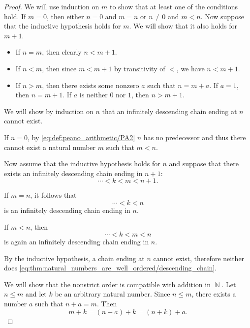 \begin{proof}
  We will use induction on \( m \) to show that at least one of the conditions hold. If \( m = 0 \), then either \( n = 0 \) and \( m = n \) or \( n \neq 0 \) and \( m < n \). Now suppose that the inductive hypothesis holds for \( m \). We will show that it also holds for \( m + 1 \).
  \begin{itemize}
    \item If \( n = m \), then clearly \( n < m + 1 \).
    \item If \( n < m \), then since \( m < m + 1 \) by transitivity of \( < \), we have \( n < m + 1 \).
    \item If \( n > m \), then there exists some nonzero \( a \) such that \( n = m + a \). If \( a = 1 \), then \( n = m + 1 \). If \( a \) is neither \( 0 \) nor \( 1 \), then \( n > m + 1 \).
  \end{itemize}

   We will show by induction on \( n \) that an infinitely descending chain ending at \( n \) cannot exist.

  If \( n = 0 \), by \eqref{eq:def:peano_arithmetic/PA2} \( n \) has no predecessor and thus there cannot exist a natural number \( m \) such that \( m < n \).

  Now assume that the inductive hypothesis holds for \( n \) and suppose that there exists an infinitely descending chain ending in \( n + 1 \):
  \begin{equation}\label{eq:thm:natural_numbers_are_well_ordered/descending_chain}
    \cdots < k < m < n + 1.
  \end{equation}

  If \( m = n \), it follows that
  \begin{equation*}
    \cdots < k < n
  \end{equation*}
  is an infinitely descending chain ending in \( n \).

  If \( m < n \), then
  \begin{equation*}
    \cdots < k < m < n
  \end{equation*}
  is again an infinitely descending chain ending in \( n \).

  By the inductive hypothesis, a chain ending at \( n \) cannot exist, therefore neither does \eqref{eq:thm:natural_numbers_are_well_ordered/descending_chain}.

   We will show that the nonstrict order is compatible with addition in \( \BbbN \). Let \( n \leq m \) and let \( k \) be an arbitrary natural number. Since \( n \leq m \), there exists a number \( a \) such that \( n + a = m \). Then
  \begin{equation*}
    m + k = (n + a) + k = (n + k) + a.
  \end{equation*}


\end{proof}
